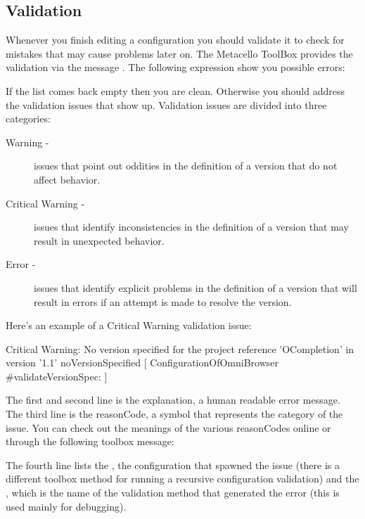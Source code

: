 \documentclass[a4paper,10pt,twoside]{book}
\begin{document}
\subsection{Validation}

Whenever you finish editing a configuration you should validate it to check for mistakes that may cause problems later on. The Metacello ToolBox provides the validation via the message . The following expression show you possible errors: 

If the list comes back empty then you are clean. Otherwise you should address the validation issues that show up. Validation issues are divided into three categories:

\begin{description}
\item[Warning -] issues that point out oddities in the definition of a version that do not affect behavior.
\item[Critical Warning -] issues that identify inconsistencies in the definition of a version that may result in unexpected behavior.
\item[ Error -] issues that identify explicit problems in the definition of a version that will result in errors if an attempt is made to resolve the version.
\end{description}

Here's an example of a Critical Warning validation issue:
\begin{code}{}
Critical Warning: No version specified for the project reference 'OCompletion'
                in version '1.1'
     { noVersionSpecified }
     [ ConfigurationOfOmniBrowser #validateVersionSpec: ]
\end{code}     

The first and second line is the explanation, a human readable error message. The third line is the reasonCode, a symbol that represents the category of the issue. You can check out the meanings of the various reasonCodes online or through the following toolbox message:

The fourth line lists the , \ie the configuration that spawned the issue (there is a different toolbox method for running a recursive configuration validation) and the , which is the name of the validation method that generated the error (this is used mainly for debugging).
\end{document}
